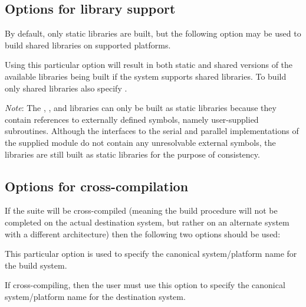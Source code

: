 \subsection*{Options for library support}

\noindent By default, only static libraries are built, but the following option
may be used to build shared libraries on supported platforms.

\begin{config}

\item {}

  Using this particular option will result in both static and shared versions
  of the available {\sundials} libraries being built if the system supports
  shared libraries. To build only shared libraries also specify .

  {\em Note}: The {\fcvode}, {\fkinsol}, and {\fida} libraries can only be built as
  static libraries because they contain references to externally defined symbols,
  namely user-supplied {\F} subroutines.  Although the {\F} interfaces to the serial
  and parallel implementations of the supplied {\nvector} module do not contain any
  unresolvable external symbols, the libraries are still built as static libraries
  for the purpose of consistency.

\end{config}

\subsection*{Options for cross-compilation}


\noindent If the {\sundials} suite will be cross-compiled (meaning the build
procedure will not be completed on the actual destination system, but rather
on an alternate system with a different architecture) then the following two
options should be used:

\begin{config}

\item {}

  This particular option is used to specify the canonical system/platform name
  for the build system.

\item {}

  If cross-compiling, then the user must use this option to specify the canonical
  system/platform name for the destination system.

\end{config}

